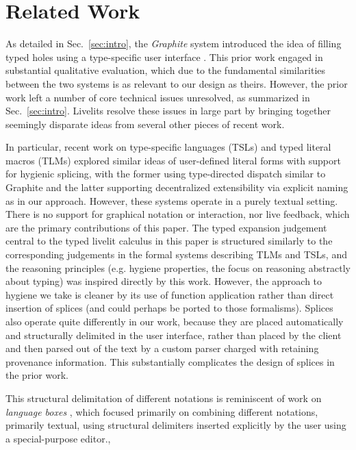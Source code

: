 \section{Related Work}\label{sec:related-work}
As detailed in Sec.~\ref{sec:intro},
the \emph{Graphite} system introduced the idea of filling 
typed holes using a type-specific user interface \cite{Graphite}.
This prior work engaged in substantial qualitative evaluation, 
which due to the fundamental similarities between the two systems 
is as relevant to our design as theirs. However, the prior work 
left a number of core technical issues unresolved, 
as summarized in Sec.~\ref{sec:intro}. 
Livelits resolve these issues in large part by bringing together 
seemingly disparate ideas from several other pieces of recent work.

In particular, recent work on type-specific languages (TSLs) \cite{TSLs} 
and typed literal macros (TLMs) \cite{TLMs}
explored similar ideas of user-defined
literal forms with support for hygienic splicing, with the former 
using type-directed dispatch similar to Graphite and the latter supporting 
decentralized extensibility via explicit naming as in our approach. 
However, these systems operate in a purely 
textual setting. There is no support for graphical notation or 
interaction, nor live feedback, which are the primary contributions of this paper.
The typed expansion judgement central to the typed livelit calculus in this paper 
is structured similarly 
to the corresponding judgements in the formal systems describing TLMs and TSLs,
and the reasoning principles (e.g. hygiene properties, the focus on reasoning abstractly 
about typing) was inspired directly by this work. However, the  
approach to hygiene we take is cleaner by its use of function application 
rather than direct insertion of splices (and could perhaps be ported to those formalisms).
Splices also operate quite differently in our work,
because they are placed automatically and structurally delimited in the user interface, rather than 
placed by the client and then parsed out of the text by a custom parser charged 
with retaining provenance information.
This substantially complicates the design of splices in the prior work.

This structural delimitation of different notations is reminiscent of work on 
\emph{language boxes} \cite{DBLP:conf/sle/RenggliDN09}, which focused primarily on 
combining different notations, primarily textual, using structural delimiters inserted 
explicitly by the user using a special-purpose editor.,

